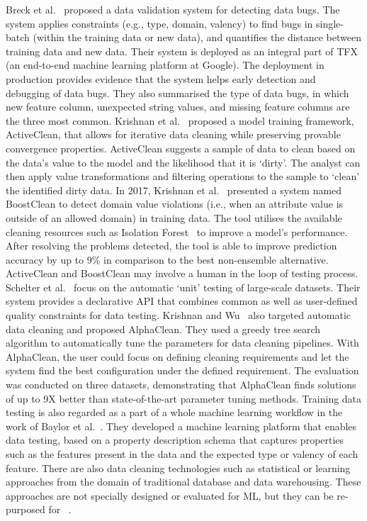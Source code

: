 Breck et al.~ proposed a data validation system for detecting data bugs. 
The system applies constraints (e.g., type, domain, valency) to find bugs in single-batch (within the training data or new data),
and quantifies the distance between training data and new data.
Their system is deployed as an integral part of TFX (an end-to-end machine learning platform at Google).
The deployment in production provides evidence that the system helps early detection and debugging of data bugs.
They also summarised the type of data bugs, in which new feature column, unexpected string values, and missing feature columns are the three most common.
Krishnan et al.~ proposed a model training framework, ActiveClean, that allows for iterative data cleaning while preserving provable convergence properties.
ActiveClean suggests a sample of data to clean based on the data's value to the model and the likelihood that it is `dirty'. 
The analyst can then apply value transformations and filtering operations to the sample to `clean' the identified dirty data.
In 2017, Krishnan et al.~ presented a system named BoostClean to detect domain value violations (i.e., when an attribute value is outside of an allowed domain) in training data.
The tool utilises the available cleaning resources such as Isolation Forest~ to improve a model's performance.
After resolving the problems detected, the tool is able to improve prediction accuracy by up to 9\% in comparison to the best non-ensemble alternative.
ActiveClean and BoostClean may involve a human in the loop of testing process.
Schelter et al.~ focus on the automatic `unit' testing of large-scale datasets.
Their system provides a declarative API that combines common as well as user-defined quality constraints for data testing.
Krishnan and Wu~ also targeted automatic data cleaning and proposed AlphaClean.
They used a greedy tree search algorithm to automatically tune the parameters for data cleaning pipelines.
With AlphaClean, the user could focus on defining cleaning requirements and let the system find the best configuration under the defined requirement.
The evaluation was conducted on three datasets, demonstrating that AlphaClean finds solutions of up to 9X better than state-of-the-art parameter tuning methods.
Training data testing is also regarded as a part of a whole machine learning workflow in the work of Baylor et al.~.
They developed a machine learning platform that enables data testing, based on a property description schema that captures properties such as the features present in the data and the expected type or valency of each feature.
There are also data cleaning technologies such as statistical or learning approaches from the domain of traditional database and data warehousing.
These approaches are not specially designed or evaluated for ML, but they can be re-purposed for \mlt{}~.

